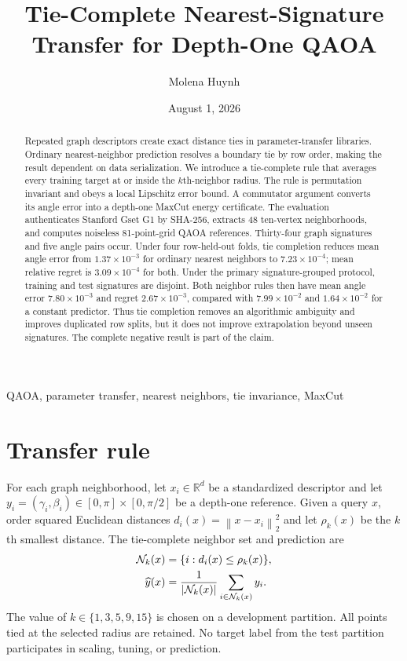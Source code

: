 \documentclass[10pt,letterpaper,twoside]{article}
\newcommand{\norm}[1]{\left\lVert #1\right\rVert}
\begin{document}
\title{Tie-Complete Nearest-Signature Transfer for Depth-One QAOA}
\author{Molena Huynh}
\date{August 1, 2026}

\maketitle

\begin{abstract}
Repeated graph descriptors create exact distance ties in parameter-transfer
libraries.  Ordinary nearest-neighbor prediction resolves a boundary tie by
row order, making the result dependent on data serialization.  We introduce a
tie-complete rule that averages every training target at or inside the
$k$th-neighbor radius.  The rule is permutation invariant and obeys a local
Lipschitz error bound.  A commutator argument converts its angle error into a
depth-one MaxCut energy certificate.  The evaluation authenticates Stanford
Gset G1 by SHA-256, extracts 48 ten-vertex neighborhoods, and computes
noiseless 81-point-grid QAOA references.  Thirty-four graph signatures and
five angle pairs occur.  Under four row-held-out folds, tie completion reduces
mean angle error from $1.37\times10^{-3}$ for ordinary nearest neighbors to
$7.23\times10^{-4}$; mean relative regret is $3.09\times10^{-4}$ for both.
Under the primary signature-grouped protocol, training and test signatures
are disjoint.  Both neighbor rules then have mean angle error
$7.80\times10^{-3}$ and regret $2.67\times10^{-3}$, compared with
$7.99\times10^{-2}$ and $1.64\times10^{-2}$ for a constant predictor.
Thus tie completion removes an algorithmic ambiguity and improves duplicated
row splits, but it does not improve extrapolation beyond unseen signatures.
The complete negative result is part of the claim.
\end{abstract}

\begin{keywords}
QAOA, parameter transfer, nearest neighbors, tie invariance, MaxCut
\end{keywords}

\section{Transfer rule}

For each graph neighborhood, let $x_i\in\mathbb R^d$ be a standardized
descriptor and let
$y_i=(\gamma_i,\beta_i)\in[0,\pi]\times[0,\pi/2]$ be a depth-one reference.
Given a query $x$, order squared Euclidean distances
$d_i(x)=\norm{x-x_i}_2^2$ and let $\rho_k(x)$ be the $k$th smallest distance.
The tie-complete neighbor set and prediction are
\begin{align}
 \mathcal N_k(x)&=\{i:d_i(x)\le\rho_k(x)\},\notag\\
 \widehat y(x)&=\frac1{|\mathcal N_k(x)|}
                    \sum_{i\in\mathcal N_k(x)}y_i.   \label{eq:method}
\end{align}
The value of $k\in\{1,3,5,9,15\}$ is chosen on a development partition.
All points tied at the selected radius are retained.  No target label from
the test partition participates in scaling, tuning, or prediction.
\end{document}
